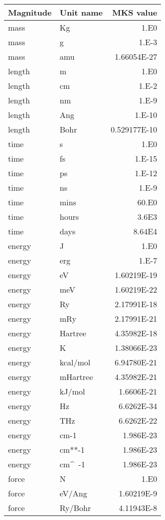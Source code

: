 \documentclass[11pt]{article}
\begin{document}
\begin{center}
\begin{tabular}{llr}
Magnitude & Unit name & MKS value \\
\hline
mass     & Kg         & 1.E0 \\
mass     & g          & 1.E-3 \\
mass     & amu        & 1.66054E-27 \\
length   & m          & 1.E0 \\
length   & cm         & 1.E-2 \\
length   & nm         & 1.E-9 \\
length   & Ang        & 1.E-10 \\
length   & Bohr       & 0.529177E-10 \\
time     & s          & 1.E0 \\
time     & fs         & 1.E-15 \\
time     & ps         & 1.E-12 \\
time     & ns         & 1.E-9 \\
time     & mins       & 60.E0 \\
time     & hours      & 3.6E3 \\
time     & days       & 8.64E4 \\
energy   & J          & 1.E0 \\
energy   & erg        & 1.E-7 \\
energy   & eV         & 1.60219E-19 \\
energy   & meV        & 1.60219E-22 \\
energy   & Ry         & 2.17991E-18 \\
energy   & mRy        & 2.17991E-21 \\
energy   & Hartree    & 4.35982E-18 \\
energy   & K          & 1.38066E-23 \\
energy   & kcal/mol   & 6.94780E-21 \\
energy   & mHartree   & 4.35982E-21 \\
energy   & kJ/mol     & 1.6606E-21 \\
energy   & Hz         & 6.6262E-34 \\
energy   & THz        & 6.6262E-22 \\
energy   & cm-1       & 1.986E-23 \\
energy   & cm**-1     & 1.986E-23 \\
energy   & cm\^~-1      & 1.986E-23 \\
force    & N          & 1.E0 \\
force    & eV/Ang     & 1.60219E-9 \\
force    & Ry/Bohr    & 4.11943E-8 \\
\hline
\end{tabular}


\end{center}
\end{document}
